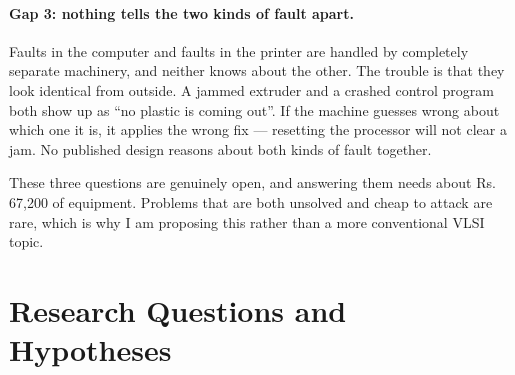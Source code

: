 \documentclass[11pt,a4paper]{article}
\newcommand{\rupee}{\textrm{Rs.}}
\begin{document}
\paragraph{Gap 3: nothing tells the two kinds of fault apart.}
Faults in the computer and faults in the printer are handled by completely
separate machinery, and neither knows about the other. The trouble is that they
look identical from outside. A jammed extruder and a crashed control program both
show up as ``no plastic is coming out''. If the machine guesses wrong about which
one it is, it applies the wrong fix --- resetting the processor will not clear a
jam. No published design reasons about both kinds of fault together.

\medskip\noindent
These three questions are genuinely open, and answering them needs about
\rupee\,67{,}200 of equipment. Problems that are both unsolved and cheap to attack are rare,
which is why I am proposing this rather than a more conventional VLSI topic.

\section{Research Questions and Hypotheses}
\end{document}

